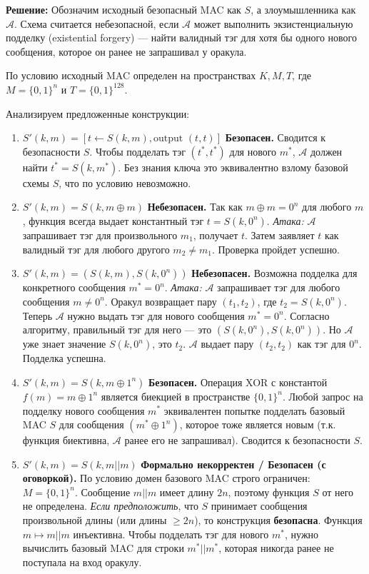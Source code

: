 ﻿\documentclass[9pt,a4paper]{extarticle}
\begin{document}
\textbf{Решение:} Обозначим исходный безопасный MAC как \(S\), а злоумышленника как \(\mathcal{A}\). Схема считается небезопасной, если \(\mathcal{A}\) может выполнить экзистенциальную подделку (existential forgery) --- найти валидный тэг для хотя бы одного нового сообщения, которое он ранее не запрашивал у оракула.

По условию исходный MAC определен на пространствах \(K, M, T\), где \(M=\{0,1\}^n\) и \(T=\{0,1\}^{128}\).

Анализируем предложенные конструкции:

\begin{enumerate}
\def\labelenumi{\arabic{enumi}.}
\item
  \textbf{\(S'(k, m) = [t \leftarrow S(k,m), \text{output } (t, t)]\)} \textbf{Безопасен.} Сводится к безопасности \(S\). Чтобы подделать тэг \((t^*, t^*)\) для нового \(m^*\), \(\mathcal{A}\) должен найти \(t^* = S(k, m^*)\). Без знания ключа это эквивалентно взлому базовой схемы \(S\), что по условию невозможно.
\item
  \textbf{\(S'(k, m) = S(k, m \oplus m)\)} \textbf{Небезопасен.} Так как \(m \oplus m = 0^n\) для любого \(m\), функция всегда выдает константный тэг \(t = S(k, 0^n)\). \emph{Атака:} \(\mathcal{A}\) запрашивает тэг для произвольного \(m_1\), получает \(t\). Затем заявляет \(t\) как валидный тэг для любого другого \(m_2 \neq m_1\). Проверка пройдет успешно.
\item
  \textbf{\(S'(k, m) = (S(k, m), S(k, 0^n))\)} \textbf{Небезопасен.} Возможна подделка для конкретного сообщения \(m^* = 0^n\). \emph{Атака:} \(\mathcal{A}\) запрашивает тэг для любого сообщения \(m \neq 0^n\). Оракул возвращает пару \((t_1, t_2)\), где \(t_2 = S(k, 0^n)\). Теперь \(\mathcal{A}\) нужно выдать тэг для нового сообщения \(m^* = 0^n\). Согласно алгоритму, правильный тэг для него --- это \((S(k, 0^n), S(k, 0^n))\). Но \(\mathcal{A}\) уже знает значение \(S(k, 0^n)\), это \(t_2\). \(\mathcal{A}\) выдает пару \((t_2, t_2)\) как тэг для \(0^n\). Подделка успешна.
\item
  \textbf{\(S'(k, m) = S(k, m \oplus 1^n)\)} \textbf{Безопасен.} Операция XOR с константой \(f(m) = m \oplus 1^n\) является биекцией в пространстве \(\{0,1\}^n\). Любой запрос на подделку нового сообщения \(m^*\) эквивалентен попытке подделать базовый MAC \(S\) для сообщения \((m^* \oplus 1^n)\), которое тоже является новым (т.к. функция биективна, \(\mathcal{A}\) ранее его не запрашивал). Сводится к безопасности \(S\).
\item
  \textbf{\(S'(k, m) = S(k, m || m)\)} \textbf{Формально некорректен / Безопасен (с оговоркой).} По условию домен базового MAC строго ограничен: \(M=\{0,1\}^n\). Сообщение \(m||m\) имеет длину \(2n\), поэтому функция \(S\) от него не определена. \emph{Если предположить}, что \(S\) принимает сообщения произвольной длины (или длины \(\ge 2n\)), то конструкция \textbf{безопасна}. Функция \(m \mapsto m||m\) инъективна. Чтобы подделать тэг для нового \(m^*\), нужно вычислить базовый MAC для строки \(m^* || m^*\), которая никогда ранее не поступала на вход оракулу.

\end{enumerate}
\end{document}
